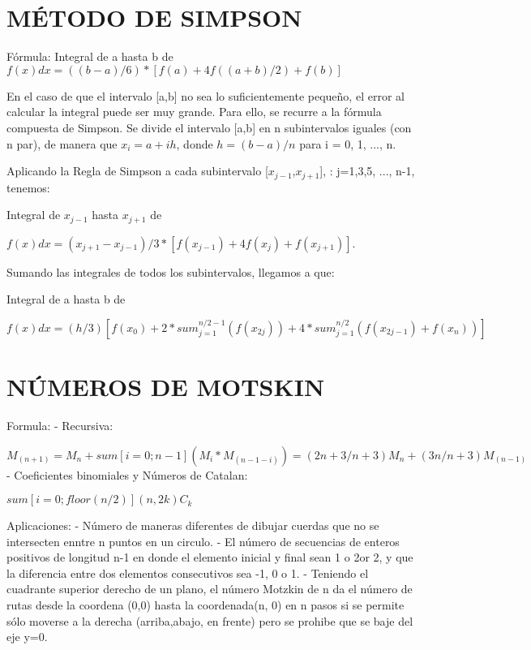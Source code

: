 \documentclass{article}
\begin{document}
\section*{M\'ETODO DE SIMPSON}
F\'ormula:
 Integral de a hasta b de $f(x) dx = ((b-a)/6) * [f(a) + 4f((a+b)/2) + f(b)]$
 
En el caso de que el intervalo [a,b] no sea lo suficientemente peque\~no, el error al calcular la integral puede ser muy grande. 
Para ello, se recurre a la f\'ormula compuesta de Simpson. Se divide el intervalo [a,b] en n subintervalos iguales (con n par), de manera que  $x_i = a + ih$, 
donde  $h = (b-a)/n$ para i = 0, 1, ..., n.

Aplicando la Regla de Simpson a cada subintervalo  [$x_{j-1}$,$x_{j+1}$], :  j=1,3,5, ..., n-1,  tenemos:

 Integral de $x_{j-1}$ hasta $x_{j+1}$ de 
 
 $f(x)dx = (x_{j+1}-x_{j-1})/3 * [ f(x_{j-1}) + 4f(x_j)+ f(x_{j+1}) ]$.

Sumando las integrales de todos los subintervalos, llegamos a que:

 Integral de a hasta b de 
 
 $f(x) dx = (h/3) [ f(x_0)+ 2 * sum_{j=1}^{n/2-1}( f(x_{2j}) ) + 4*sum_{j=1}^{n/2}( f(x_{2j-1})+ f(x_n) ) ]$




\section*{N\'UMEROS DE MOTSKIN}

Formula: 
   - Recursiva: 
   
   $M_(n+1) =  M_n + sum [ i=0; n-1 ] (M_i*M_(n-1-i)) = (2n+3/n+3)M_n + (3n/n+3)M_(n-1)$
   - Coeficientes binomiales y N\'umeros de Catalan: 
   
   $sum [i=0; floor(n/2)]( n , 2k ) C_k$
   
Aplicaciones:
   - N\'umero de maneras diferentes de dibujar cuerdas que no se intersecten enntre n puntos en un circulo.
   - El n\'umero de secuencias de enteros positivos de longitud n-1 en donde el elemento inicial y final sean 1 o 2or 2, y que la diferencia entre dos elementos consecutivos sea -1, 0 o 1.
   - Teniendo el cuadrante superior derecho de un plano, el n\'umero Motzkin de n da el n\'umero de rutas desde la coordena (0,0) hasta la coordenada(n, 0) en n pasos
     si se permite s\'olo moverse a la derecha (arriba,abajo, en frente) pero se prohibe que se baje del eje y=0.
\newpage
\end{document}
